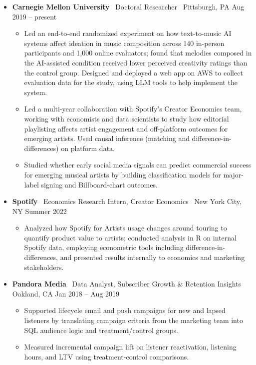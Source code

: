 \documentclass[10pt,letterpaper]{article}
\newcommand{\sep}{{\color{gray}\,\textbullet\,\,}}
\begin{document}
\begin{itemize}[leftmargin=0pt, label={}]
\item \textbf{Carnegie Mellon University} \sep Doctoral Researcher \sep Pittsburgh, PA \hfill Aug 2019 -- present
  \begin{itemize}
  \item Led an end-to-end randomized experiment on how text-to-music AI systems affect ideation in music composition across 140 in-person participants and 1{,}000 online evaluators; found that melodies composed in the AI-assisted condition received lower perceived creativity ratings than the control group. Designed and deployed a web app on AWS to collect evaluation data for the study, using LLM tools to help implement the system.
  \item Led a multi-year collaboration with Spotify's Creator Economics team, working with economists and data scientists to study how editorial playlisting affects artist engagement and off-platform outcomes for emerging artists. Used causal inference (matching and difference-in-differences) on platform data.
  \item Studied whether early social media signals can predict commercial success for emerging musical artists by building classification models for major-label signing and Billboard-chart outcomes.
  \end{itemize}
\item \textbf{Spotify} \sep Economics Research Intern, Creator Economics \sep New York City, NY \hfill Summer 2022
  \begin{itemize}
  \item Analyzed how Spotify for Artists usage changes around touring to quantify product value to artists; conducted analysis in R on internal Spotify data, employing econometric tools including difference-in-differences, and presented results internally to economics and marketing stakeholders.
  \end{itemize}
\item \textbf{Pandora Media} \sep Data Analyst, Subscriber Growth \& Retention Insights \sep Oakland, CA \hfill Jan 2018 -- Aug 2019
  \begin{itemize}
  \item Supported lifecycle email and push campaigns for new and lapsed listeners by translating campaign criteria from the marketing team into SQL audience logic and treatment/control groups.
  \item Measured incremental campaign lift on listener reactivation, listening hours, and LTV using treatment-control comparisons.

\end{itemize}
\end{itemize}
\end{document}
